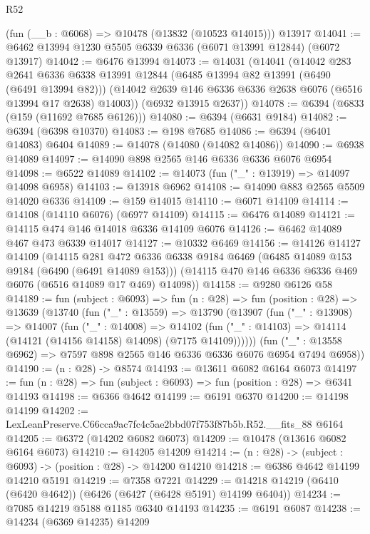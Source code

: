 \begin{lexlean}{R52}
\begin{coremodule}
    (fun (__b : @6068) => @10478 (@13832 (@10523 @14015)))
    @13917
@14041 := @6462 @13994 @1230 @5505 @6339 @6336 (@6071 @13991 @12844) (@6072 @13917)
@14042 := @6476 @13994
@14073 := @14031
    (@14041
      (@14042
        @283
        @2641
        @6336
        @6338
        @13991
        @12844
        (@6485 @13994 @82 @13991 (@6490 (@6491 @13994 @82)))
        (@14042 @2639 @146 @6336 @6336 @2638 @6076 (@6516 @13994 @17 @2638) @14003))
      (@6932 @13915 @2637))
@14078 := @6394 (@6833 (@159 (@11692 @7685 @6126)))
@14080 := @6394 (@6631 @9184)
@14082 := @6394 (@6398 @10370)
@14083 := @198 @7685
@14086 := @6394 (@6401 @14083) @6404
@14089 := @14078 (@14080 (@14082 @14086))
@14090 := @6938 @14089
@14097 := @14090 @898 @2565 @146 @6336 @6336 @6076 @6954
@14098 := @6522 @14089
@14102 := @14073 (fun ("_" : @13919) => @14097 @14098 @6958)
@14103 := @13918 @6962
@14108 := @14090 @883 @2565 @5509 @14020 @6336
@14109 := @159 @14015
@14110 := @6071 @14109
@14114 := @14108 (@14110 @6076) (@6977 @14109)
@14115 := @6476 @14089
@14121 := @14115 @474 @146 @14018 @6336 @14109 @6076
@14126 := @6462 @14089 @467 @473 @6339 @14017
@14127 := @10332 @6469
@14156 := @14126
    @14127
    @14109
    (@14115
      @281
      @472
      @6336
      @6338
      @9184
      @6469
      (@6485 @14089 @153 @9184 (@6490 (@6491 @14089 @153)))
      (@14115 @470 @146 @6336 @6336 @469 @6076 (@6516 @14089 @17 @469) @14098))
@14158 := @9280 @6126 @58
@14189 := fun (subject : @6093) =>
  fun (n : @28) =>
  fun (position : @28) =>
  @13639
    (@13740
      (fun ("_" : @13559) =>
      @13790
        (@13907
          (fun ("_" : @13908) =>
          @14007
            (fun ("_" : @14008) =>
            @14102 (fun ("_" : @14103) => @14114 (@14121 (@14156 @14158) @14098) (@7175 @14109))))))
      (fun ("_" : @13558 @6962) => @7597 @898 @2565 @146 @6336 @6336 @6076 @6954 @7494 @6958))
@14190 := (n : @28) -> @8574
@14193 := @13611 @6082 @6164 @6073
@14197 := fun (n : @28) => fun (subject : @6093) => fun (position : @28) => @6341 @14193
@14198 := @6366 @4642
@14199 := @6191 @6370
@14200 := @14198 @14199
@14202 := LexLeanPreserve.C66cca9ac7fc4c5ae2bbd07f753f87b5b.R52.__fits_88 @6164
@14205 := @6372 (@14202 @6082 @6073)
@14209 := @10478 (@13616 @6082 @6164 @6073)
@14210 := @14205 @14209
@14214 := (n : @28) -> (subject : @6093) -> (position : @28) -> @14200 @14210
@14218 := @6386 @4642 @14199 @14210 @5191
@14219 := @7358 @7221
@14229 := @14218 @14219 (@6410 (@6420 @4642)) (@6426 (@6427 (@6428 @5191) @14199 @6404))
@14234 := @7085 @14219 @5188 @1185 @6340 @14193
@14235 := @6191 @6087
@14238 := @14234 (@6369 @14235) @14209

\end{coremodule}
\end{lexlean}
